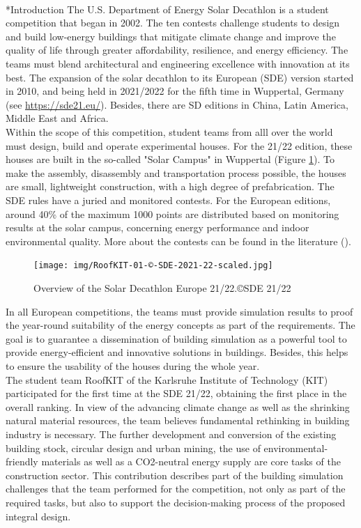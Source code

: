 \documentclass[twocolumn, a4paper,10pt]{article}
\makeatletter
\renewcommand\section{\@startsection{section}{1}{\z@}{3pt}{3pt}{\normalfont\large\bfseries}}
\makeatother
\begin{document}
\section*{Introduction}
The U.S. Department of Energy\textsuperscript{\textregistered} Solar Decathlon is a student competition that began in 2002. The ten contests challenge students to design and build low-energy buildings that mitigate climate change and improve the quality of life through greater affordability, resilience, and energy efficiency. The teams must blend architectural and engineering excellence with innovation at its best. The expansion of the solar decathlon to its European (SDE) version started in 2010, and being held in 2021/2022 for the fifth time in Wuppertal, Germany (see \textcolor{blue}{\url{https://sde21.eu/}}). Besides, there are SD editions in China, Latin America, Middle East and Africa.\\
Within the scope of this competition, student teams from alll over the world must design, build and operate experimental houses. For the 21/22 edition, these houses are built in the so-called "Solar Campus" in Wuppertal (Figure \ref{fig:SDE}). To make the assembly, disassembly and transportation process possible, the houses are small, lightweight construction, with a high degree of prefabrication. The SDE rules have a juried and monitored contests. For the European editions, around 40\% of the maximum 1000 points are distributed based on monitoring results at the solar campus, concerning energy performance and indoor environmental quality. More about the contests can be found in the literature (\citet{voss2021}).

\begin{figure}[H]
\centering
\texttt{[image: img/RoofKIT-01-©-SDE-2021-22-scaled.jpg]}
\vspace{2pt} 
\caption{Overview of the Solar Decathlon Europe 21/22.\copyright SDE 21/22}
\label{fig:SDE}
\end{figure}
\vspace{-2pt}

In all European competitions, the teams must provide simulation results to proof the year-round suitability of the energy concepts as part of the requirements. The goal is to guarantee a dissemination of building simulation as a powerful tool to provide energy-efficient and innovative solutions in buildings. Besides, this helps to ensure the usability of the houses during the whole year. \\
The student team RoofKIT of the Karlsruhe Institute of Technology (KIT) participated for the first time at the SDE 21/22, obtaining the first place in the overall ranking. In view of the advancing climate change as well as the shrinking natural material resources, the team believes fundamental rethinking in building industry is necessary. The further development and conversion of the existing building stock, circular design and urban mining, the use of environmental-friendly materials as well as a CO2-neutral energy supply are core tasks of the construction sector. This contribution describes part of the building simulation challenges that the team performed for the competition, not only as part of the required tasks, but also to support the decision-making process of the proposed integral design.
\end{document}
